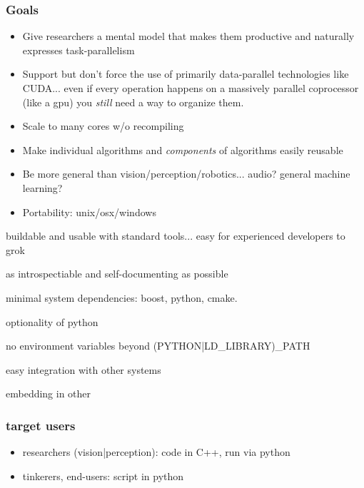 \begin{frame}[fragile]
\frametitle{Goals}

\begin{itemize}[<alert@+>]

\item Give researchers a mental model that makes them productive and
naturally expresses task-parallelism

\item Support but don't force the use of primarily data-parallel
technologies like CUDA... even if every operation happens on a
massively parallel coprocessor (like a gpu) you \emph{still} need a way
to organize them.

\item Scale to many cores w/o recompiling

\item Make individual algorithms and \emph{components} of algorithms easily
reusable

\item Be more general than vision/perception/robotics... audio?  general
machine learning?

\item Portability: unix/osx/windows
\end{itemize}

buildable and usable with standard tools... easy for experienced developers to grok

as introspectiable and self-documenting as possible

minimal system dependencies:  boost, python, cmake.

optionality of python

no environment variables beyond (PYTHON|LD\_LIBRARY)\_PATH

easy integration with other systems

embedding in other
\end{frame}

\begin{frame}[fragile]
\frametitle{target users}

\begin{itemize}[<alert@+>]

\item researchers (vision|perception):  code in C++, run via python

\item tinkerers, end-users:  script in python
\end{itemize}
\end{frame}

